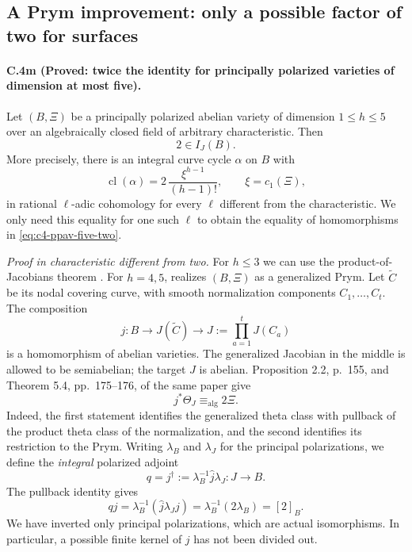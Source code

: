 \subsection{A Prym improvement: only a possible factor of two for surfaces}
\label{sec:c4-prym-improvement}

\paragraph{C.4m (Proved: twice the identity for principally polarized varieties of dimension at most five).}
Let $(B,\Xi)$ be a principally polarized abelian variety of dimension
$1\le h\le5$ over an algebraically closed field of arbitrary characteristic.
Then
\begin{equation}\label{eq:c4-ppav-five-two}
                         2\in I_J(B).
\end{equation}
More precisely, there is an integral curve cycle $\alpha$ on $B$ with
\begin{equation}\label{eq:c4-twice-minimal-cycle}
       \operatorname{cl}(\alpha)
          =2\,\frac{\xi^{h-1}}{(h-1)!},\qquad \xi=c_1(\Xi),
\end{equation}
in rational $\ell$-adic cohomology for every $\ell$ different from the
characteristic. We only need this equality for one such $\ell$ to obtain
the equality of homomorphisms in \eqref{eq:c4-ppav-five-two}.

\emph{Proof in characteristic different from two.}
For $h\le3$ we can use the product-of-Jacobians theorem
\citep[Theorem 4, p.~2 of the opened preprint]{cyOortUeno1973}.
For $h=4,5$, \citet[Theorem 6.5(i), p.~178]{frC4Beauville1977}
realizes $(B,\Xi)$ as a generalized Prym. Let $\widetilde C$ be its
nodal covering curve, with smooth normalization components
$C_1,\ldots,C_t$. The composition
\[
 j:B\longrightarrow J(\widetilde C)
            \longrightarrow J:=\prod_{a=1}^{t}J(C_a)
\]
is a homomorphism of abelian varieties. The generalized Jacobian in
the middle is allowed to be semiabelian; the target $J$ is abelian.
Proposition 2.2, p.~155, and Theorem 5.4, pp.~175--176, of the same
paper give
\[
                         j^*\Theta_J\equiv_{\mathrm{alg}}2\Xi.
\]
Indeed, the first statement identifies the generalized theta class
with pullback of the product theta class of the normalization, and
the second identifies its restriction to the Prym.
Writing $\lambda_B$ and $\lambda_J$ for the principal polarizations,
we define the \emph{integral} polarized adjoint
\[
             q=j^\dagger:=\lambda_B^{-1}\widehat j\lambda_J:J\to B.
\]
The pullback identity gives
\begin{equation}\label{eq:c4-prym-adjoint}
 qj=\lambda_B^{-1}(\widehat j\lambda_Jj)
    =\lambda_B^{-1}(2\lambda_B)=[2]_B.
\end{equation}
We have inverted only principal polarizations, which are actual
isomorphisms. In particular, a possible finite kernel of $j$ has not
been divided out.

